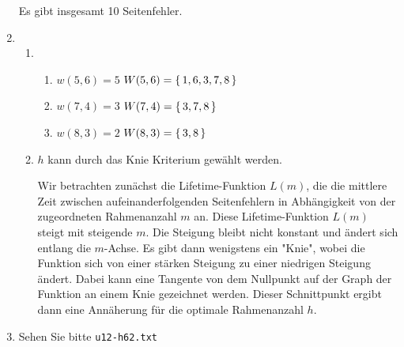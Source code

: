\begin{enumerate}[label={Aufgabe H\arabic*},start=60]
        Es gibt insgesamt 10 Seitenfehler.
    \item 
        \begin{enumerate}
            \item 
                \begin{enumerate}[label={(\roman*)}]
                    \item $w(5,6) = 5$ \hspace{1cm} $W(5,6) = \left\{\,1, 6, 3, 7, 8\,\right\}$ 
                    \item $w(7,4) = 3$ \hspace{1cm} $W(7,4) = \left\{\,3, 7, 8\,\right\}$
                    \item $w(8,3) = 2$ \hspace{1cm} $W(8,3) = \left\{\,3, 8\,\right\}$
                \end{enumerate}
            \item $h$ kann durch das Knie Kriterium gewählt werden. 

                Wir betrachten zunächst die Lifetime-Funktion $L(m)$, die die mittlere Zeit zwischen aufeinanderfolgenden Seitenfehlern in Abhängigkeit von der zugeordneten Rahmenanzahl $m$ an. Diese Lifetime-Funktion $L(m)$ steigt mit steigende $m$. Die Steigung bleibt nicht konstant und ändert sich entlang die $m$-Achse. Es gibt dann wenigstens ein "Knie", wobei die Funktion sich von einer stärken Steigung zu einer niedrigen Steigung ändert. Dabei kann eine Tangente von dem Nullpunkt auf der Graph der Funktion an einem Knie gezeichnet werden. Dieser Schnittpunkt ergibt dann eine Annäherung für die optimale Rahmenanzahl $h$.
        \end{enumerate}
    \item Sehen Sie bitte \texttt{u12-h62.txt}
\end{enumerate}